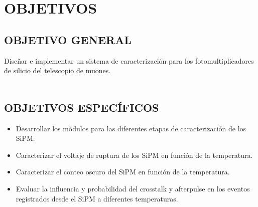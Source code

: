 \chapter{OBJETIVOS}
\label{Cap:Objetivos}
\section{OBJETIVO GENERAL}
Diseñar e implementar un sistema de caracterización para los fotomultiplicadores de silicio del
telescopio de muones.\\ \\

\section{OBJETIVOS ESPECÍFICOS}
\begin{itemize}
    \item Desarrollar los módulos para las diferentes etapas de caracterización de los SiPM.
    \item Caracterizar el voltaje de ruptura de los SiPM en función de la temperatura.
    \item Caracterizar el conteo oscuro del SiPM en función de la temperatura.
    \item Evaluar la influencia y probabilidad del crosstalk y afterpulse en los eventos registrados desde
el SiPM a diferentes temperaturas.
\end{itemize}
